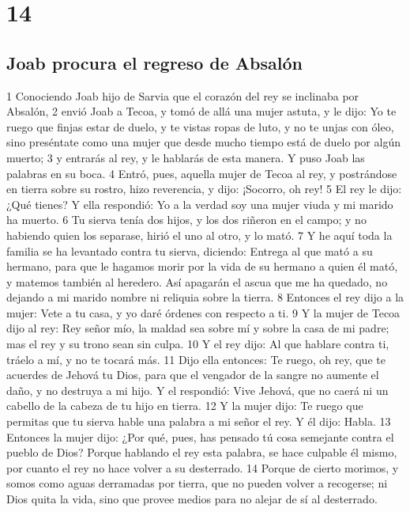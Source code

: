\chapter{14}

\section*{Joab procura el regreso de Absalón}

1 Conociendo Joab hijo de Sarvia que el corazón del rey se inclinaba por Absalón,
2 envió Joab a Tecoa, y tomó de allá una mujer astuta, y le dijo: Yo te ruego que finjas estar de duelo, y te vistas ropas de luto, y no te unjas con óleo, sino preséntate como una mujer que desde mucho tiempo está de duelo por algún muerto;
3 y entrarás al rey, y le hablarás de esta manera. Y puso Joab las palabras en su boca.
4 Entró, pues, aquella mujer de Tecoa al rey, y postrándose en tierra sobre su rostro, hizo reverencia, y dijo: ¡Socorro, oh rey!
5 El rey le dijo: ¿Qué tienes? Y ella respondió: Yo a la verdad soy una mujer viuda y mi marido ha muerto.
6 Tu sierva tenía dos hijos, y los dos riñeron en el campo; y no habiendo quien los separase, hirió el uno al otro, y lo mató. 
7 Y he aquí toda la familia se ha levantado contra tu sierva, diciendo: Entrega al que mató a su hermano, para que le hagamos morir por la vida de su hermano a quien él mató, y matemos también al heredero. Así apagarán el ascua que me ha quedado, no dejando a mi marido nombre ni reliquia sobre la tierra.
8 Entonces el rey dijo a la mujer: Vete a tu casa, y yo daré órdenes con respecto a ti.
9 Y la mujer de Tecoa dijo al rey: Rey señor mío, la maldad sea sobre mí y sobre la casa de mi padre; mas el rey y su trono sean sin culpa.
10 Y el rey dijo: Al que hablare contra ti, tráelo a mí, y no te tocará más.
11 Dijo ella entonces: Te ruego, oh rey, que te acuerdes de Jehová tu Dios, para que el vengador de la sangre no aumente el daño, y no destruya a mi hijo. Y el respondió: Vive Jehová, que no caerá ni un cabello de la cabeza de tu hijo en tierra.
12 Y la mujer dijo: Te ruego que permitas que tu sierva hable una palabra a mi señor el rey. Y él dijo: Habla.
13 Entonces la mujer dijo: ¿Por qué, pues, has pensado tú cosa semejante contra el pueblo de Dios? Porque hablando el rey esta palabra, se hace culpable él mismo, por cuanto el rey no hace volver a su desterrado.
14 Porque de cierto morimos, y somos como aguas derramadas por tierra, que no pueden volver a recogerse; ni Dios quita la vida, sino que provee medios para no alejar de sí al desterrado.
